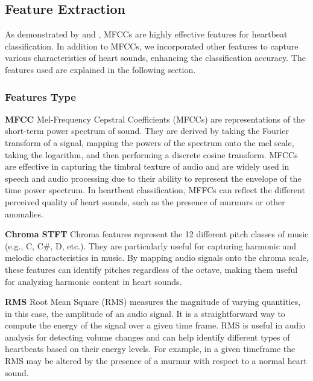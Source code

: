 \documentclass[twocolumn]{class}
\begin{document}
\subsection{Feature Extraction}
As demonstrated by \cite{Raza_Mehmood_Ullah_Ahmad_Choi_On_2019} and \cite{Chen_Sun_Chen_Xie_Wu_Xu_2021}, MFCCs 
are highly effective features for heartbeat classification. In addition to MFCCs, 
we incorporated other features to capture various characteristics of heart sounds, enhancing the classification accuracy.
The features used are explained in the following section.

\subsubsection{Features Type}

\textbf{MFCC}\newline
Mel-Frequency Cepstral Coefficients (MFCCs) are representations of the short-term power spectrum of sound. 
They are derived by taking the Fourier transform of a signal, mapping the powers of the spectrum onto the mel 
scale, taking the logarithm, and then performing a discrete cosine transform. MFCCs are effective in capturing 
the timbral texture of audio and are widely used in speech and audio processing due to 
their ability to represent the envelope of the time power spectrum.
In heartbeat classification, MFFCs can reflect the different perceived quality of heart sounds,
such as the presence of murmurs or other anomalies.

\vspace{0.5cm}\noindent
\textbf{Chroma STFT}\newline
Chroma features represent the 12 different pitch classes of music (e.g., C, C\#, D, etc.). 
They are particularly useful for capturing harmonic and melodic characteristics in music. 
By mapping audio signals onto the chroma scale, these features can identify pitches regardless 
of the octave, making them useful for analyzing harmonic content in heart sounds.

\vspace{0.5cm}\noindent
\textbf{RMS}\newline
Root Mean Square (RMS) measures the magnitude of varying quantities, in this case, 
the amplitude of an audio signal. It is a straightforward way to compute the energy of 
the signal over a given time frame. RMS is useful in audio analysis for detecting volume 
changes and can help identify different types of heartbeats based on their energy levels.
For example, in a given timeframe the RMS may be altered by the presence of a murmur
with respect to a normal heart sound.
\end{document}

